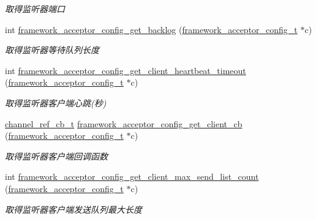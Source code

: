 \begin{DoxyCompactItemize}
\begin{DoxyCompactList}\small\item\em 取得监听器端口 \end{DoxyCompactList}\item 
int \hyperlink{a00056_a448d720795e0814e071d8d2212bd8af7_a448d720795e0814e071d8d2212bd8af7}{framework\+\_\+acceptor\+\_\+config\+\_\+get\+\_\+backlog} (\hyperlink{a00051_a61a4e424ff4c86631423dedd97c40064_a61a4e424ff4c86631423dedd97c40064}{framework\+\_\+acceptor\+\_\+config\+\_\+t} $\ast$c)
\begin{DoxyCompactList}\small\item\em 取得监听器等待队列长度 \end{DoxyCompactList}\item 
int \hyperlink{a00056_a69627295fbc0455a27fc5f072fbec3f6_a69627295fbc0455a27fc5f072fbec3f6}{framework\+\_\+acceptor\+\_\+config\+\_\+get\+\_\+client\+\_\+heartbeat\+\_\+timeout} (\hyperlink{a00051_a61a4e424ff4c86631423dedd97c40064_a61a4e424ff4c86631423dedd97c40064}{framework\+\_\+acceptor\+\_\+config\+\_\+t} $\ast$c)
\begin{DoxyCompactList}\small\item\em 取得监听器客户端心跳(秒) \end{DoxyCompactList}\item 
\hyperlink{a00051_ae296ec4d1ce108960de8dcc423956a1d_ae296ec4d1ce108960de8dcc423956a1d}{channel\+\_\+ref\+\_\+cb\+\_\+t} \hyperlink{a00056_ac7701d809c6474d8e606d224b8f63259_ac7701d809c6474d8e606d224b8f63259}{framework\+\_\+acceptor\+\_\+config\+\_\+get\+\_\+client\+\_\+cb} (\hyperlink{a00051_a61a4e424ff4c86631423dedd97c40064_a61a4e424ff4c86631423dedd97c40064}{framework\+\_\+acceptor\+\_\+config\+\_\+t} $\ast$c)
\begin{DoxyCompactList}\small\item\em 取得监听器客户端回调函数 \end{DoxyCompactList}\item 
int \hyperlink{a00056_abbc66fe7a78fe5ecc57377558578fdb9_abbc66fe7a78fe5ecc57377558578fdb9}{framework\+\_\+acceptor\+\_\+config\+\_\+get\+\_\+client\+\_\+max\+\_\+send\+\_\+list\+\_\+count} (\hyperlink{a00051_a61a4e424ff4c86631423dedd97c40064_a61a4e424ff4c86631423dedd97c40064}{framework\+\_\+acceptor\+\_\+config\+\_\+t} $\ast$c)
\begin{DoxyCompactList}\small\item\em 取得监听器客户端发送队列最大长度 \end{DoxyCompactList}\item 

\end{DoxyCompactItemize}
